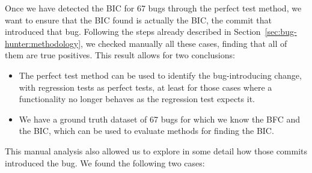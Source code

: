 Once we have detected the BIC for 67 bugs through the perfect test method, we want to ensure that the BIC found is actually the BIC, the commit that introduced that bug. Following the steps already described in Section~\ref{sec:bug-hunter:methodology}, we checked manually all these cases, finding that all of them are true positives. This result allows for two conclusions:
\begin{itemize}
\item The perfect test method can be used to identify the bug-introducing change, with regression tests as perfect tests, at least for those cases where a functionality no longer behaves as the regression test expects it.
\item We have a ground truth dataset of 67 bugs for which we know the BFC and the BIC, which can be used to evaluate methods for finding the BIC.
\end{itemize}

This manual analysis also allowed us to explore in some detail how those commits introduced the bug. We found the following two cases:

